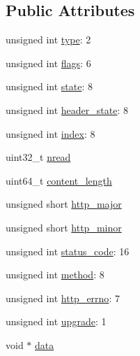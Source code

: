 \subsection*{Public Attributes}
\begin{DoxyCompactItemize}
\item 
unsigned int \hyperlink{structhttp__parser_ac6c327558547d55eb64a8aea1310cc2e}{type}\-: 2
\item 
unsigned int \hyperlink{structhttp__parser_a5e54708e0cb3f9ced19bd829dcdeaf53}{flags}\-: 6
\item 
unsigned int \hyperlink{structhttp__parser_a6f5952e0b47c83aeacf64fc287fd8003}{state}\-: 8
\item 
unsigned int \hyperlink{structhttp__parser_ac5b254b99c6472ca19ae1f426758ce75}{header\-\_\-state}\-: 8
\item 
unsigned int \hyperlink{structhttp__parser_a6f7ba706f975f447b3bf72be97facdf8}{index}\-: 8
\item 
uint32\-\_\-t \hyperlink{structhttp__parser_a78085ca896bb3b9aa1ecb0f6fddc039d}{nread}
\item 
uint64\-\_\-t \hyperlink{structhttp__parser_a7fd5a194802b1206bb773e096d291f29}{content\-\_\-length}
\item 
unsigned short \hyperlink{structhttp__parser_ac994a4a8268652f5ce82de5bde5c3f9d}{http\-\_\-major}
\item 
unsigned short \hyperlink{structhttp__parser_ae8af6433c824f5348773842db62ad4ab}{http\-\_\-minor}
\item 
unsigned int \hyperlink{structhttp__parser_a82f5aed92ca3566489def7bc384bab26}{status\-\_\-code}\-: 16
\item 
unsigned int \hyperlink{structhttp__parser_a7955de339fafd81ad54380845913457d}{method}\-: 8
\item 
unsigned int \hyperlink{structhttp__parser_ab8638d65fa174bc1925d77e2533117fa}{http\-\_\-errno}\-: 7
\item 
unsigned int \hyperlink{structhttp__parser_a748f476eacc5ac56b84dd07dbafb42a4}{upgrade}\-: 1
\item 
void $\ast$ \hyperlink{structhttp__parser_a7e87ce57b97f60f1fdb7039a8ecb0bca}{data}
\end{DoxyCompactItemize}


